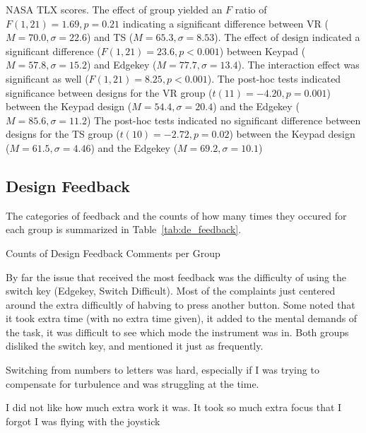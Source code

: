 NASA TLX scores.
The effect of group yielded an $F$ ratio of $F(1, 21) = 1.69, p = 0.21$ indicating a significant difference between VR ($M = 70.0, \sigma = 22.6$) and TS ($M = 65.3, \sigma = 8.53$).
The effect of design indicated a significant difference ($F(1, 21) = 23.6, p < 0.001$) between Keypad ($M = 57.8, \sigma=15.2$) and Edgekey ($M=77.7, \sigma=13.4$).
The interaction effect was significant as well ($F(1, 21) = 8.25, p < 0.001$).
The post-hoc tests indicated significance between designs for the VR group ($t(11) = -4.20, p = 0.001$) between the Keypad design ($M = 54.4, \sigma = 20.4$) and the Edgekey ($M = 85.6, \sigma = 11.2$)
The post-hoc tests indicated no significant difference between designs for the TS group ($t(10) = -2.72, p = 0.02$) between the Keypad design ($M = 61.5, \sigma = 4.46$) and the Edgekey ($M = 69.2, \sigma = 10.1$)

\subsection{Design Feedback}

The categories of feedback and the counts of how many times they occured for each group is summarized in Table~\ref{tab:de_feedback}.

\begin{table}
    \centering
    \caption{Counts of Design Feedback Comments per Group}
    \label{tab:de_feedback}
\end{table}

By far the issue that received the most feedback was the difficulty of using the switch key (Edgekey, Switch Difficult).
Most of the complaints just centered around the extra difficultly of habving to press another button.
Some noted that it took extra time (with no extra time given), it added to the mental demands of the task, it was difficult to see which mode the instrument was in.
Both groups disliked the switch key, and mentioned it just as frequently.
\begin{displayquote}[TS Subject]
    Switching from numbers to letters was hard, especially if I was trying to compensate for turbulence and was struggling at the time.
\end{displayquote}
\begin{displayquote}[VR Subject]
    I did not like how much extra work it was. It took so much extra focus that I forgot I was flying with the joystick
\end{displayquote}


